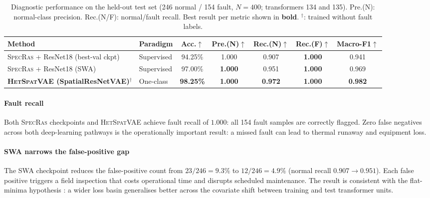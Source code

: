 \documentclass[preprint,12pt,3p]{elsarticle}
\let\cite\citep   %
\newcommand{\zerone}{\textsc{SpecRas}\xspace}      %
\newcommand{\hetspatvae}{\textsc{HetSpatVAE}\xspace} %
\newcommand{\hczv}{\hetspatvae}                    %
\begin{document}
\begin{table}[H]
  \centering
  \caption{%
    Diagnostic performance on the held-out test set
    (246 normal / 154 fault, $N=400$; transformers 134 and 135).
    Pre.(N): normal-class precision.
    Rec.(N/F): normal/fault recall.
    Best result per metric shown in \textbf{bold}.
    $^\dagger$: trained without fault labels.
  }
  \label{tab:main_results}
  \small
  \renewcommand{\arraystretch}{1.25}
  \begin{tabular}{@{}p{3.6cm}p{1.9cm}ccccc@{}}
    \toprule
    Method & Paradigm
      & Acc.$\uparrow$
      & Pre.(N)$\uparrow$
      & Rec.(N)$\uparrow$
      & Rec.(F)$\uparrow$
      & Macro-F1$\uparrow$ \\
    \midrule

    \zerone{} + ResNet18 (best-val ckpt)
      & Supervised   & 94.25\% & 1.000 & 0.907 & \textbf{1.000} & 0.941 \\
    \zerone{} + ResNet18 (SWA)
      & Supervised   & 97.00\% & \textbf{1.000}
                    & 0.951   & \textbf{1.000} & 0.969 \\
    \textbf{\hczv{} (SpatialResNetVAE)}$^\dagger$
      & One-class    & \textbf{98.25\%} & \textbf{1.000} & \textbf{0.972} & \textbf{1.000} & \textbf{0.982} \\
    \bottomrule
  \end{tabular}
\end{table}

\paragraph{Fault recall}
Both \zerone checkpoints and \hczv achieve fault recall of $1.000$:
all 154 fault samples are correctly flagged.
Zero false negatives across both deep-learning pathways is the
operationally important result: a missed fault can lead to thermal
runaway and equipment loss.

\paragraph{SWA narrows the false-positive gap}
The SWA checkpoint reduces the false-positive count from
$23/246 = 9.3\%$ to $12/246 = 4.9\%$ (normal recall $0.907 \to 0.951$).
Each false positive triggers a field inspection that costs operational
time and disrupts scheduled maintenance.
The result is consistent with the flat-minima hypothesis
\cite{izmailov2018averaging}: a wider loss basin generalises better
across the covariate shift between training and test transformer units.
\end{document}
